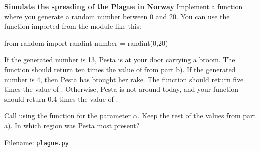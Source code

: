 \begin{Problem}{\textbf{Simulate the spreading of the Plague in Norway}}
Implement a function  where you generate a random number between 0 and 20. You can use the  function imported from the  module like this:
\begin{python}
from random import randint
number = randint(0,20)
\end{python}
If the generated number is 13, Pesta is at your door carrying a broom. The function should return ten times the value of  from part b).
If the generated number is 4, then Pesta has brought her rake. The function should return five times the value of .
Otherwise, Pesta is not around today, and your function should return 0.4 times the value of .

Call  using the  function for the parameter $\alpha$. Keep the rest of the values from part a). In which region was Pesta most present?

Filename: \texttt{plague.py}

\end{Problem}
